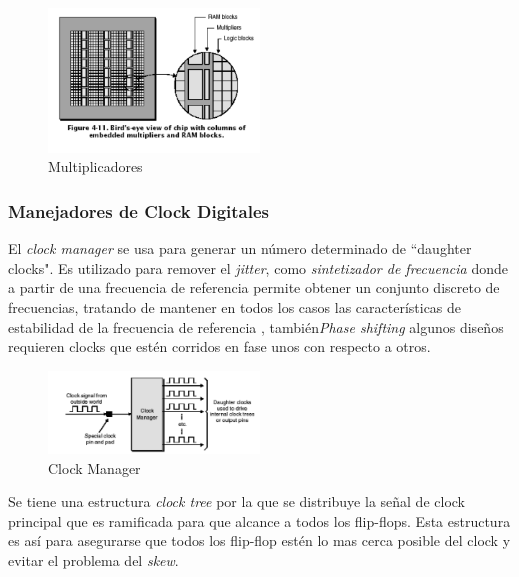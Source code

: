 \begin{figure}[h!]
 \begin{center}
 \includegraphics[width=0.5\textwidth,keepaspectratio=true]{./images/multram}
  \caption{Multiplicadores}
  \label{fig:esquema}
 \end{center}
\end{figure}

\subsubsection{Manejadores de Clock Digitales}

El \textit{clock manager} se usa para generar un número determinado de “daughter clocks". Es utilizado para remover el \textit{jitter}, como \textit{sintetizador de frecuencia} donde a partir de una frecuencia de referencia permite obtener un conjunto discreto de frecuencias, tratando de mantener en todos los casos las características de estabilidad de la frecuencia de referencia \cite{Etiqueta03}, también\textit{Phase shifting} algunos diseños requieren clocks que estén corridos en fase unos con respecto a otros.

\begin{figure}[h!]
 \begin{center}
 \includegraphics[width=0.5\textwidth,keepaspectratio=true]{./images/dougther}
  \caption{Clock Manager}
  \label{fig:esquema}
 \end{center}
\end{figure}

Se tiene  una estructura \textit{clock tree} por la que se distribuye la señal de clock principal que es ramificada para que alcance a todos los flip-flops. Esta estructura es así para asegurarse que todos los flip-flop estén lo mas cerca posible del clock y evitar el problema del \textit{skew}.

